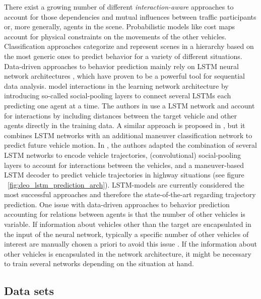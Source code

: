 There exist a growing number of different \emph{interaction-aware} approaches to account for those dependencies and mutual influences between traffic participants or, more generally, agents in the scene.
Probabilistic models like cost maps \cite{Bahram2016} account for physical constraints on the movements of the other vehicles.
Classification approaches categorize and represent scenes in a hierarchy \cite{Bonnin2012} based on the most generic ones to predict behavior for a variety of different situations.
Data-driven approaches to behavior prediction mainly rely on \ac{LSTM} neural network architectures \cite{Hochreiter1997}, which have proven to be a powerful tool for sequential data analysis.
\cite{Alahi2016} model interactions in the learning network architecture by introducing so-called social-pooling layers to connect several \acp{LSTM} each predicting one agent at a time.
The authors in \cite{Altche2018} use a \ac{LSTM} network and account for interactions by including distances between the target vehicle and other agents directly in the training data.
A similar approach is proposed in \cite{Deo2018}, but it combines \ac{LSTM} networks with an additional maneuver classification network to predict future vehicle motion.
In \cite{Deo2018a}, the authors adapted the combination of several \ac{LSTM} networks to encode vehicle trajectories, (convolutional) social-pooling layers to account for interactions between the vehicles, and a maneuver-based \ac{LSTM} decoder to predict vehicle trajectories in highway situations (see figure ~\ref{fig:deo_lstm_prediction_arch}).
\ac{LSTM}-models are currently considered the most successful approaches and therefore the state-of-the-art regarding trajectory prediction.
One issue with data-driven approaches to behavior prediction accounting for relations between agents is that the number of other vehicles is variable.
If information about vehicles other than the target are encapsulated in the input of the neural network, typically a specific number of other vehicles of interest are manually chosen a priori to avoid this issue \cite{Altche2018, Deo2018}.
If the information about other vehicles is encapsulated in the network architecture, it might be necessary to train several networks depending on the situation at hand.

\subsection{Data sets}%
\label{subsec:data_sets}

